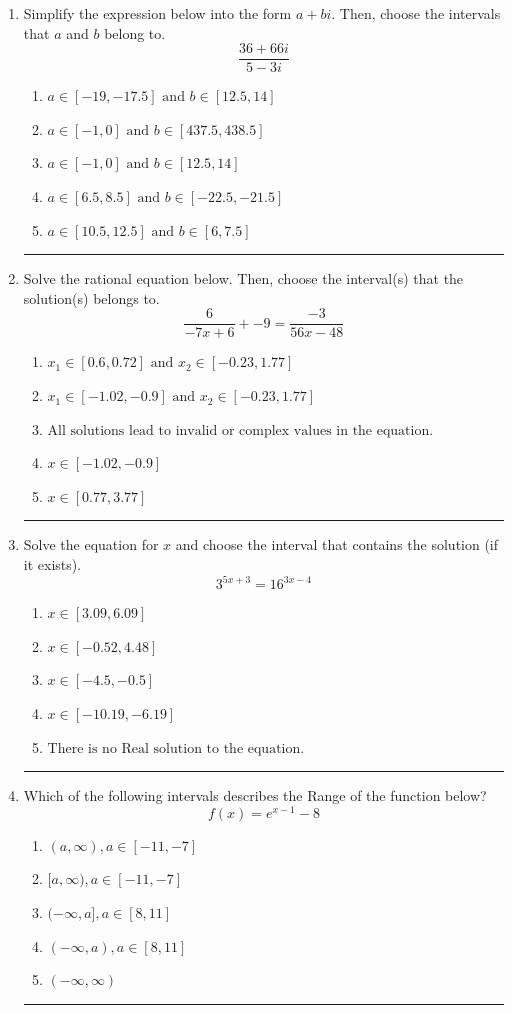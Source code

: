 \documentclass[14pt]{extbook}
\newcommand{\litem}[1]{\item#1\hspace*{-1cm}\rule{\textwidth}{0.4pt}}
\begin{document}
\begin{enumerate}
{\begin{enumerate}[label=\Alph*.]
\end{enumerate} }
\litem{
Simplify the expression below into the form $a+bi$. Then, choose the intervals that $a$ and $b$ belong to.\[ \frac{36 + 66 i}{5 - 3 i} \]\begin{enumerate}[label=\Alph*.]
\item \( a \in [-19, -17.5] \text{ and } b \in [12.5, 14] \)
\item \( a \in [-1, 0] \text{ and } b \in [437.5, 438.5] \)
\item \( a \in [-1, 0] \text{ and } b \in [12.5, 14] \)
\item \( a \in [6.5, 8.5] \text{ and } b \in [-22.5, -21.5] \)
\item \( a \in [10.5, 12.5] \text{ and } b \in [6, 7.5] \)

\end{enumerate} }
\litem{
Solve the rational equation below. Then, choose the interval(s) that the solution(s) belongs to.\[ \frac{6}{-7x + 6} + -9 = \frac{-3}{56x -48} \]\begin{enumerate}[label=\Alph*.]
\item \( x_1 \in [0.6, 0.72] \text{ and } x_2 \in [-0.23,1.77] \)
\item \( x_1 \in [-1.02, -0.9] \text{ and } x_2 \in [-0.23,1.77] \)
\item \( \text{All solutions lead to invalid or complex values in the equation.} \)
\item \( x \in [-1.02,-0.9] \)
\item \( x \in [0.77,3.77] \)

\end{enumerate} }
\litem{
Solve the equation for $x$ and choose the interval that contains the solution (if it exists).\[ 3^{5x+3} = 16^{3x-4} \]\begin{enumerate}[label=\Alph*.]
\item \( x \in [3.09, 6.09] \)
\item \( x \in [-0.52, 4.48] \)
\item \( x \in [-4.5, -0.5] \)
\item \( x \in [-10.19, -6.19] \)
\item \( \text{There is no Real solution to the equation.} \)

\end{enumerate} }
\litem{
Which of the following intervals describes the Range of the function below?\[ f(x) = e^{x-1}-8 \]\begin{enumerate}[label=\Alph*.]
\item \( (a, \infty), a \in [-11, -7] \)
\item \( [a, \infty), a \in [-11, -7] \)
\item \( (-\infty, a], a \in [8, 11] \)
\item \( (-\infty, a), a \in [8, 11] \)
\item \( (-\infty, \infty) \)


\end{enumerate}}
\end{enumerate}
\end{document}
